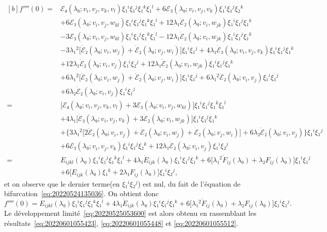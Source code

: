 \documentclass[12pt, final]{amsart}
\theoremstyle{definition}
\begin{document}
\begin{equation*}
  \begin{aligned}[b]
    f''''(0)
    ={} & ℰ₄(λ₀; v_i, v_j, v_k , v_l) ξ₁^i ξ₁^j ξ₁^k ξ₁^l + 6ℰ₃(λ₀; v_i, v_j, v_k) ξ₁^i ξ₁^j ξ₂^k\\
    & + 6ℰ₃(λ₀; v_i, v_j, w_{k l}) ξ₁^i ξ₁^j ξ₁^k ξ₁^l + 12 λ₁ \dot{ℰ}₂ (λ₀; v_{i }, w_{j k}) ξ₁^i ξ₁^j ξ₁^k\\
    & - 3ℰ₃(λ₀; v_i, v_j, w_{k l}) ξ₁^i ξ₁^j ξ₁^k ξ₁^l - 12 λ₁ \dot{ℰ}₂ (λ₀; v_i, w_{j k}) ξ₁^i ξ₁^j ξ₁^k\\
    & - 3 λ₁^2 \bigl[\dot{ℰ}₂(λ₀; v_i, w_j) + \dot{ℰ}₂(λ₀; v_j, w_i)\bigr] ξ₁^i ξ₁^j + 4 λ₁ \dot{ℰ}₃(λ₀; v_i, v_j, v_k) ξ₁^i ξ₁^j ξ₁^k\\
    & + 12 λ₁ \dot{ℰ}₂(λ₀; v_i, v_j) ξ₁^i ξ₂^j + 12 λ₁ \dot{ℰ}₂(λ₀ ; v_i, w_{j k}) ξ₁^i ξ₁^j ξ₁^k\\
    & + 6 λ₁^2 \bigl[\dot{ℰ}₂(λ₀; v_i, w_j) + \dot{ℰ}₂(λ₀; v_j, w_i)\bigr] ξ₁^i ξ₁^j + 6 λ₁^2 \ddot{ℰ}₂(λ₀; v_i, v_j) ξ₁^i ξ₁^j\\
    & + 6 λ₂ \dot{ℰ}₂(λ₀; v_i, v_j) ξ₁^i ξ₁^j\\
    ={} & \bigl[ ℰ₄(λ₀; v_i, v_j, v_k , v_l) + 3ℰ₃(λ₀; v_i, v_j, w_{k l}) \bigr] ξ₁^i ξ₁^j ξ₁^k ξ₁^l\\
    & + 4 λ₁ \bigl[\dot{ℰ}₃(λ₀; v_i, v_j, v_k) + 3 \dot{ℰ}₂(λ₀; v_i, w_{j k})\bigr] ξ₁^i ξ₁^j ξ₁^k\\
    & + \bigl\{ 3 λ₁^2 \bigl[2 \ddot{ℰ}₂ (λ₀; v_i, v_j) + \dot{ℰ}₂(λ₀; v_i, w_j) + \dot{ℰ}₂(λ₀; v_j, w_i)\bigr] + 6 λ₂ \dot{ℰ}₂(λ₀; v_i, v_j) \bigr\} ξ₁^i ξ₁^j\\
    & + 6ℰ₃(λ₀; v_i, v_j, v_k) ξ₁^i ξ₁^j ξ₂^k + 12 λ₁ \dot{ℰ}₂(λ₀; v_i, v_j) ξ₁^i ξ₂^j\\
    ={} & E_{i j k l}(λ₀) ξ₁^i ξ₁^j ξ₁^k ξ₁^l + 4 λ₁ \dot{E}_{i j k} (λ₀) ξ₁^i ξ₁^j ξ₁^k + 6 \bigl[λ₁^2 \dot{F}_{i j}(λ₀) + λ₂ F_{i j}(λ₀)\bigr] ξ₁^i ξ₁^j\\
    & + 6 \bigl[E_{i j k}(λ₀) ξ₁^k + 2 λ₁ F_{i j}(λ₀)\bigr] ξ₁^i ξ₂^j,
  \end{aligned}
\end{equation*}
et on observe que le dernier terme(en \(ξ₁^i ξ₂^j\)) est nul, du fait de
l'équation de bifurcation~\eqref{eq:20220524135036}. On obtient donc
\begin{equation}
  \label{eq:20220601055512}
  f''''(0) = E_{i j k l}(λ₀) ξ₁^i ξ₁^j ξ₁^k ξ₁^l + 4 λ₁ \dot{E}_{i j k}(λ₀) ξ₁^i ξ₁^j ξ₁^k + 6 \bigl[λ₁^2 \dot{F}_{i j}(λ₀) + λ₂ F_{i j}(λ₀)\bigr] ξ₁^i ξ₁^j .
\end{equation}
Le développement limité~\eqref{eq:20220525053600} est alors obtenu en
rassemblant les résultats~\eqref{eq:20220601055423}, \eqref{eq:20220601055448}
et \eqref{eq:20220601055512}.
\end{document}
